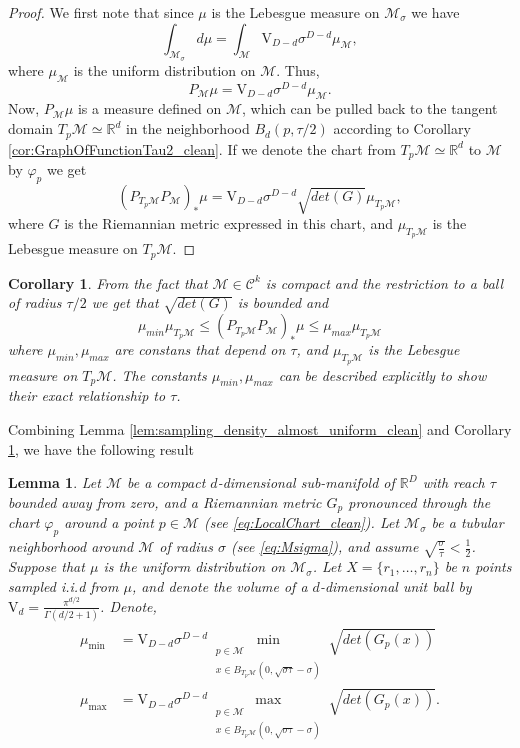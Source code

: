 \documentclass[12pt]{article}
\newtheorem{Lemma}[Theorem]{Lemma}
\newtheorem{corollary}[Theorem]{Corollary}
\theoremstyle{remark}
\newcommand{\RR}{\mathbb{R}}
\newcommand{\MM}{\mathcal{M}}
\newcommand{\C}{\mathcal{C}}
\newcommand{\emphbrackets}[1]{\emph{(}#1\emph{)}}
\begin{document}
\begin{appendices}
\begin{proof}
We first note that since $\mu$ is the Lebesgue measure on $\MM_\sigma$ we have
\[
\int_{\MM_\sigma} d\mu = \int_{\MM}\mathrm{V}_{D-d}\sigma^{D-d}\mu_\MM
,\]
where $\mu_\MM$ is the uniform distribution on $\MM$. Thus,
\[
P_\MM \mu = {\mathrm{V}_{D-d}\sigma^{D-d}}\mu_\MM
.\]
Now, $P_\MM\mu$ is a measure defined on $\MM$, which can be pulled back to the tangent domain $T_p\MM\simeq\RR^d$ in the neighborhood $B_d(p, \tau/2)$ according to Corollary \ref{cor:GraphOfFunctionTau2_clean}.
If we denote the chart from $T_p\MM\simeq\RR^d$ to $\MM$ by $\varphi_p$ we get
\[
(P_{T_p\MM}P_\MM)_*\mu = \mathrm{V}_{D-d}\sigma^{D-d} \sqrt{det(G)}\mu_{T_p\MM}
,\]
where $G$ is the Riemannian metric expressed in this chart, and $\mu_{T_p\MM}$ is the Lebesgue measure on $T_p\MM$.

\end{proof}

\begin{corollary}\label{cor:measure_projecting_bounds_clean}
	From the fact that $\MM\in\C^k$ is compact and the restriction to a ball of radius $\tau/2$ we get that $\sqrt{det(G)}$ is bounded and
	\[
	\mu_{min} \mu_{T_p\MM} \leq (P_{T_p\MM}P_\MM)_*\mu \leq \mu_{max} \mu_{T_p\MM}
	\]
	where $\mu_{min}, \mu_{max}$ are constans that depend on $\tau$, and $\mu_{T_p\MM}$ is the Lebesgue measure on $T_p\MM$.
	The constants $ \mu_{min}, \mu_{max} $ can be described explicitly to show their exact relationship to $ \tau $.
\end{corollary}

Combining Lemma \ref{lem:sampling_density_almost_uniform_clean} and Corollary \ref{cor:measure_projecting_bounds_clean}, we have the following result

\begin{Lemma}\label{lem:num_of_samples_in_a_ball_clean}
	Let $\MM$ be a compact $d$-dimensional sub-manifold of $\RR^D$ with reach $\tau$  bounded away from zero, and a Riemannian metric $G_p$ pronounced through the chart $\varphi_p$ around a point $ p\in \MM $ \emphbrackets{see \eqref{eq:LocalChart_clean}}. 
    Let $\MM_\sigma$ be a tubular neighborhood around $ \MM $ of radius $ \sigma $ \emphbrackets{see \eqref{eq:Msigma}}, and assume $\sqrt{\frac{\sigma}{\tau}} < \frac{1}{2}$. 
    Suppose that $\mu$ is the uniform distribution on $ \MM_\sigma $. 
    Let $X = \{r_1, \ldots,r_n\}$ be $n$ points sampled i.i.d from $\mu$, and denote the volume of a $d$-dimensional unit ball by  $ \mathrm{V}_d = \frac{\pi^{d/2}}{\Gamma(d/2+1)} $.
    Denote,
    \begin{align}
    \label{eq:mu_min_max_def}
    \begin{split}
    \mu_{\min} &= \mathrm{V}_{D-d}\sigma^{D-d} \min_{\substack{p\in \MM\\ x\in B_{T_p\MM}(0,\sqrt{\sigma\tau}- \sigma)}}  \sqrt{det(G_p(x))}\\
    \mu_{\max} &= \mathrm{V}_{D-d}\sigma^{D-d}\max_{\substack{p\in \MM \\ x \in B_{T_p\MM}(0,\sqrt{\sigma\tau}- \sigma)}}  \sqrt{det(G_p(x))}
    .\end{split}
    \end{align}
    

\end{Lemma}
\end{appendices}
\end{document}

